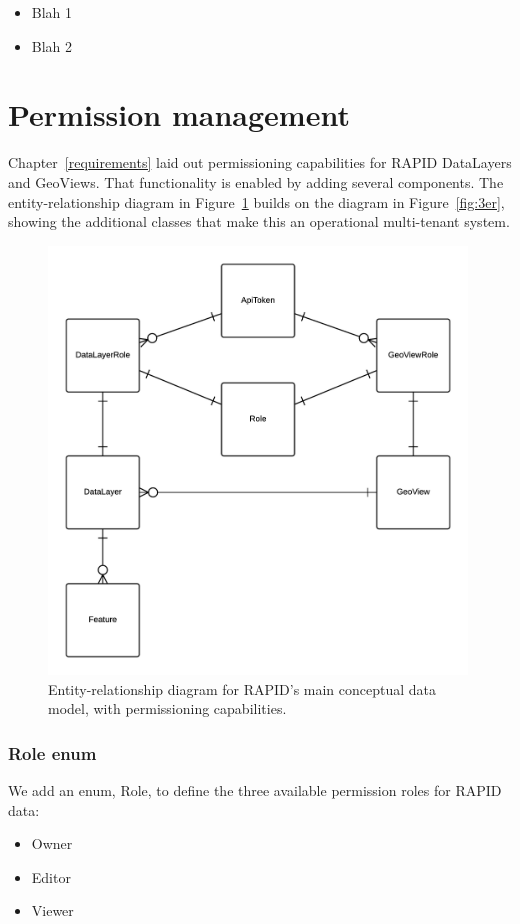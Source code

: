 \begin{itemize}
\item Blah 1
\item Blah 2
\end{itemize}

\section{Permission management}
Chapter~\ref{requirements} laid out permissioning capabilities for RAPID DataLayers and GeoViews. That functionality is enabled by adding several components. The entity-relationship diagram in Figure~\ref{fig:er} builds on the diagram in Figure~\ref{fig:3er}, showing the additional classes that make this an operational multi-tenant system.

\begin{figure}[ht]
    \centering
    \includegraphics[width=0.99\textwidth]{figures/er.png}
    \caption{Entity-relationship diagram for RAPID's main conceptual data model, with permissioning capabilities.}
    \label{fig:er}
\end{figure}

\subsubsection{Role enum}
We add an enum, Role, to define the three available permission roles for RAPID data:
\begin{itemize}

  \item Owner
  \item Editor 
  \item Viewer
  \end{itemize}

